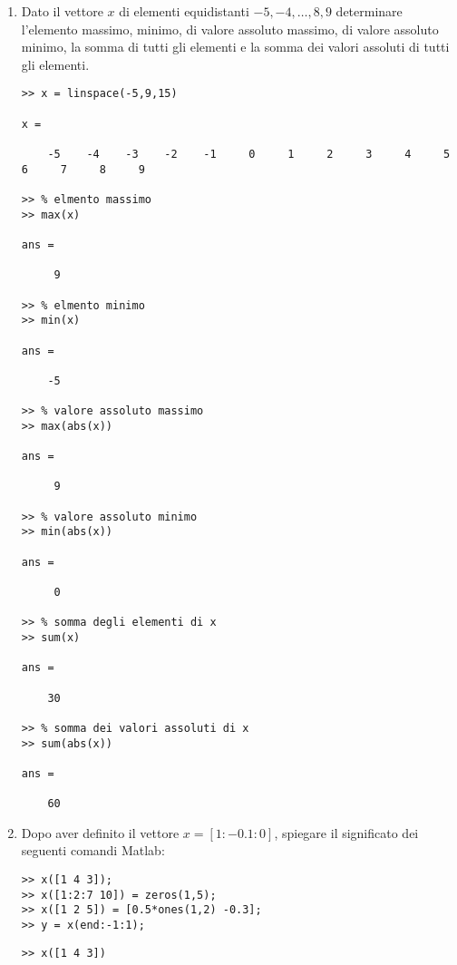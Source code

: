 \begin{enumerate}
\item Dato il vettore $x$ di elementi equidistanti $-5, -4, \ldots, 8, 9$
determinare l'elemento massimo, minimo, di valore assoluto massimo, di valore
assoluto minimo, la somma di tutti gli elementi e la somma dei valori assoluti
di tutti gli elementi.
\begin{svol}
\begin{codice}
\begin{verbatim}
>> x = linspace(-5,9,15)

x =

    -5    -4    -3    -2    -1     0     1     2     3     4     5     6     7     8     9

>> % elmento massimo
>> max(x)

ans =

     9

>> % elmento minimo
>> min(x)

ans =

    -5

>> % valore assoluto massimo
>> max(abs(x))

ans =

     9

>> % valore assoluto minimo
>> min(abs(x))

ans =

     0

>> % somma degli elementi di x
>> sum(x)

ans =

    30

>> % somma dei valori assoluti di x
>> sum(abs(x))

ans =

    60
\end{verbatim}
\end{codice}
\end{svol}

\item Dopo aver definito il vettore $x = [1 : -0.1 :0]$, spiegare il
significato dei seguenti comandi Matlab:
\begin{codice}
\begin{verbatim}
>> x([1 4 3]);
>> x([1:2:7 10]) = zeros(1,5);
>> x([1 2 5]) = [0.5*ones(1,2) -0.3];
>> y = x(end:-1:1);
\end{verbatim}
\end{codice}
\begin{svol}
\begin{codice}
\begin{verbatim}
>> x([1 4 3])


\end{verbatim}
\end{codice}
\end{svol}
\end{enumerate}
